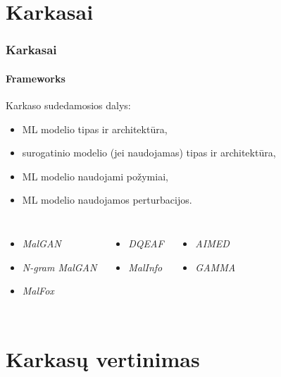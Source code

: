 \section{Karkasai}
\begin{frame}
    \frametitle{Karkasai}
    \framesubtitle{Frameworks}
    Karkaso sudedamosios dalys:\pause
    \begin{itemize}
        \item ML modelio tipas ir architektūra, \pause
        \item surogatinio modelio (jei naudojamas) tipas ir architektūra, \pause
        \item ML modelio naudojami požymiai, \pause
        \item ML modelio naudojamos perturbacijos.
    \end{itemize}\pause
    \vspace{20pt}
    \begin{columns}[t]
        \vspace{10pt}
        \begin{itemize}
            \item \textit{MalGAN}
            \item \textit{N-gram MalGAN}
            \item \textit{MalFox}
        \end{itemize}\pause
        \vspace{10pt}
        \begin{itemize}
            \item \textit{DQEAF}
            \item \textit{MalInfo}
        \end{itemize}\pause
        \vspace{10pt}
        \begin{itemize}
            \item \textit{AIMED}
            \item \textit{GAMMA}
        \end{itemize}
    \end{columns}
\end{frame}

\section{Karkasų vertinimas}

